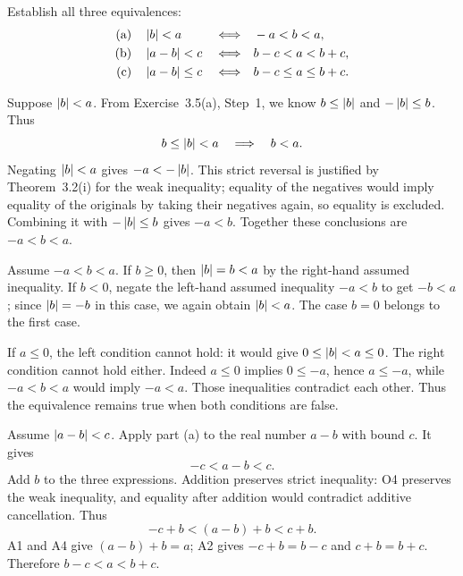 

\goal Establish all three equivalences:
\begin{align*}
 \text{(a)}\quad&\left|b\right|<a
    &&\Longleftrightarrow&&-a<b<a,\\
 \text{(b)}\quad&\left|a-b\right|<c
    &&\Longleftrightarrow&&b-c<a<b+c,\\
 \text{(c)}\quad&\left|a-b\right|\le c
    &&\Longleftrightarrow&&b-c\le a\le b+c.
\end{align*}

Suppose $\left|b\right|<a$. From Exercise~3.5(a), Step~1, we know
$b\le\left|b\right|$ and $-\left|b\right|\le b$.
Thus
\[
 b\le\left|b\right|<a\quad\Longrightarrow\quad b<a.
\]
Negating $\left|b\right|<a$ gives $-a<-\left|b\right|$. This strict reversal is
justified by Theorem~3.2(i) for the weak inequality; equality of the
negatives would imply equality of the originals by taking their
negatives again, so equality is excluded. Combining it with
$-\left|b\right|\le b$ gives $-a<b$. Together these conclusions are
$-a<b<a$.

Assume $-a<b<a$.
If $b\ge0$, then $\left|b\right|=b<a$ by the right-hand assumed inequality.
If $b<0$, negate the left-hand assumed inequality $-a<b$ to get
$-b<a$; since $\left|b\right|=-b$ in this case, we again obtain $\left|b\right|<a$.
The case $b=0$ belongs to the first case.

If $a\le0$, the left condition cannot hold: it would give
$0\le\left|b\right|<a\le0$. The right condition cannot hold either.
Indeed $a\le0$ implies $0\le-a$, hence $a\le-a$, while
$-a<b<a$ would imply $-a<a$. Those inequalities contradict each other.
Thus the equivalence remains true when both conditions are false.


Assume $\left|a-b\right|<c$. Apply part (a) to the real number $a-b$ with
bound $c$. It gives
\[
 -c<a-b<c.
\]
Add $b$ to the three expressions. Addition preserves strict inequality:
O4 preserves the weak inequality, and equality after addition would
contradict additive cancellation. Thus
\[
 -c+b<(a-b)+b<c+b.
\]
A1 and A4 give $(a-b)+b=a$; A2 gives $-c+b=b-c$ and $c+b=b+c$.
Therefore $b-c<a<b+c$.


